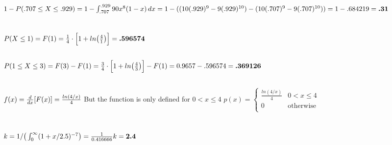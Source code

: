 \documentclass[12pt, letterpaper]{article}
\begin{document}
\subsection{}
\(
1 - P(.707 \le X \le .929) = 1 - \int_{.707}^{.929} 90x^{8}(1 - x)\, dx \\
= 1 - ((10(.929)^{9} - 9(.929)^{10}) - (10(.707)^{9} - 9(.707)^{10})) \\
= 1 - .684219 \\
= \textbf{.31} \\
\)
\section{}
\subsection{}
\(
P(X \le 1) = F(1) \\
= \frac{1}{4}\cdot \Big[ 1 + ln\big(\frac{4}{1}\big) \Big] \\
= \textbf{.596574} \\
\)
\subsection{}
\(
P(1 \le X \le 3) = F(3) - F(1) \\
= \frac{3}{4}\cdot \Big[1+ln\big(\frac{4}{3}\big) \Big] - F(1) \\
= 0.9657 - .596574 \\
= \textbf{.369126} \\
\)
\subsection{}
\(
f(x) = \frac{d}{dx}[F(x)] \\
= \frac{ln(4/x)}{4} \\
\)
But the function is only defined for $0 < x \le 4$
\newline
\(
p(x) = 
\begin{cases}
	\frac{ln(4/x)}{4} & 0 < x \le 4 \\
	0 & \textrm{otherwise} \\
\end{cases}
\)
\section{}
\subsection{}
\(
k = 1/\big(\int_{0}^{\infty} (1 + x/2.5)^{-7}\big) \\
= \frac{1}{0.416666} \\
k = \textbf{2.4} \\
\)
\end{document}
